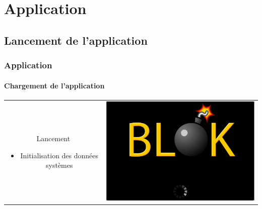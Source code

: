 \section{Application}

\subsection{Lancement de l'application}

	\begin{frame}
	\frametitle{Application}
	\framesubtitle{Chargement de l'application}
	
	\begin{center}
		\begin{tabular}{cc}
			\begin{minipage}{5cm}
				\begin{block}{Lancement}
					\begin{itemize}
				 		\item Initialisation des données systèmes
			 		\end{itemize}
				\end{block}
			\end{minipage} &
			\begin{minipage}{8cm}
				 \includegraphics[scale=0.3]{img/1.png}
			\end{minipage}\\
		\end{tabular}
	\end{center}

		
	
	\end{frame}
	
